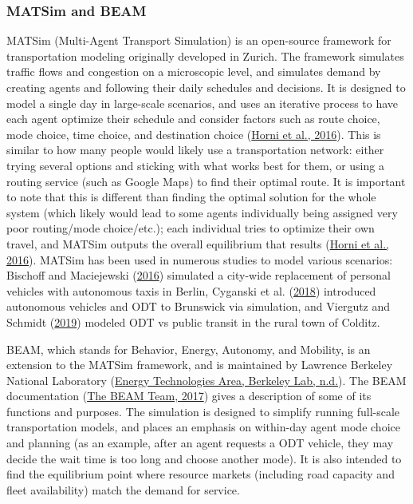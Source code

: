\documentclass[
]{article}
\begin{document}
\hypertarget{matsim-and-beam}{%
\subsubsection{MATSim and BEAM}\label{matsim-and-beam}}

MATSim (Multi-Agent Transport Simulation) is an open-source framework for transportation modeling originally developed in Zurich. The framework simulates traffic flows and congestion on a microscopic level, and simulates demand by creating agents and following their daily schedules and decisions. It is designed to model a single day in large-scale scenarios, and uses an iterative process to have each agent optimize their schedule and consider factors such as route choice, mode choice, time choice, and destination choice (\protect\hyperlink{ref-Horni2016}{Horni et al., 2016}). This is similar to how many people would likely use a transportation network: either trying several options and sticking with what works best for them, or using a routing service (such as Google Maps) to find their optimal route. It is important to note that this is different than finding the optimal solution for the whole system (which likely would lead to some agents individually being assigned very poor routing/mode choice/etc.); each individual tries to optimize their own travel, and MATSim outputs the overall equilibrium that results (\protect\hyperlink{ref-Horni2016}{Horni et al., 2016}). MATSim has been used in numerous studies to model various scenarios: Bischoff and Maciejewski (\protect\hyperlink{ref-Bischoff2016}{2016}) simulated a city-wide replacement of personal vehicles with autonomous taxis in Berlin, Cyganski et al. (\protect\hyperlink{ref-Cyganski2018}{2018}) introduced autonomous vehicles and ODT to Brunswick via simulation, and Viergutz and Schmidt (\protect\hyperlink{ref-Viergutz2019}{2019}) modeled ODT vs public transit in the rural town of Colditz.

BEAM, which stands for Behavior, Energy, Autonomy, and Mobility, is an extension to the MATSim framework, and is maintained by Lawrence Berkeley National Laboratory (\protect\hyperlink{ref-BEAMlbnl}{Energy Technologies Area, Berkeley Lab, n.d.}). The BEAM documentation (\protect\hyperlink{ref-beamdocs}{The BEAM Team, 2017}) gives a description of some of its functions and purposes. The simulation is designed to simplify running full-scale transportation models, and places an emphasis on within-day agent mode choice and planning (as an example, after an agent requests a ODT vehicle, they may decide the wait time is too long and choose another mode). It is also intended to find the equilibrium point where resource markets (including road capacity and fleet availability) match the demand for service.
\end{document}
